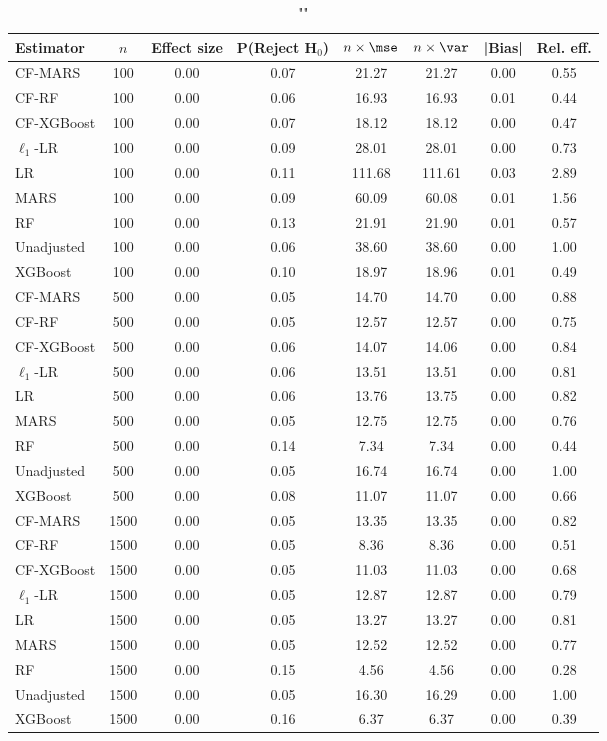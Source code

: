 \begin{table}
\centering
\caption{""}
\begin{tabular}{lccccccc}
\toprule
Estimator & $n$ & Effect size & P(Reject H$_0$) & $n\times\mse$ & $n\times \var$ & |Bias| & Rel. eff.\\ \midrule
CF-MARS & 100 & 0.00 & 0.07 &  21.27 &  21.27 & 0.00 & 0.55 \\ 
CF-RF & 100 & 0.00 & 0.06 &  16.93 &  16.93 & 0.01 & 0.44 \\ 
CF-XGBoost & 100 & 0.00 & 0.07 &  18.12 &  18.12 & 0.00 & 0.47 \\ 
$\ell_1$-LR & 100 & 0.00 & 0.09 &  28.01 &  28.01 & 0.00 & 0.73 \\ 
LR & 100 & 0.00 & 0.11 & 111.68 & 111.61 & 0.03 & 2.89 \\ 
MARS & 100 & 0.00 & 0.09 &  60.09 &  60.08 & 0.01 & 1.56 \\ 
RF & 100 & 0.00 & 0.13 &  21.91 &  21.90 & 0.01 & 0.57 \\ 
Unadjusted & 100 & 0.00 & 0.06 &  38.60 &  38.60 & 0.00 & 1.00 \\ 
XGBoost & 100 & 0.00 & 0.10 &  18.97 &  18.96 & 0.01 & 0.49 \\ \addlinespace 
CF-MARS & 500 & 0.00 & 0.05 &  14.70 &  14.70 & 0.00 & 0.88 \\ 
CF-RF & 500 & 0.00 & 0.05 &  12.57 &  12.57 & 0.00 & 0.75 \\ 
CF-XGBoost & 500 & 0.00 & 0.06 &  14.07 &  14.06 & 0.00 & 0.84 \\ 
$\ell_1$-LR & 500 & 0.00 & 0.06 &  13.51 &  13.51 & 0.00 & 0.81 \\ 
LR & 500 & 0.00 & 0.06 &  13.76 &  13.75 & 0.00 & 0.82 \\ 
MARS & 500 & 0.00 & 0.05 &  12.75 &  12.75 & 0.00 & 0.76 \\ 
RF & 500 & 0.00 & 0.14 &   7.34 &   7.34 & 0.00 & 0.44 \\ 
Unadjusted & 500 & 0.00 & 0.05 &  16.74 &  16.74 & 0.00 & 1.00 \\ 
XGBoost & 500 & 0.00 & 0.08 &  11.07 &  11.07 & 0.00 & 0.66 \\ \addlinespace 
CF-MARS & 1500 & 0.00 & 0.05 &  13.35 &  13.35 & 0.00 & 0.82 \\ 
CF-RF & 1500 & 0.00 & 0.05 &   8.36 &   8.36 & 0.00 & 0.51 \\ 
CF-XGBoost & 1500 & 0.00 & 0.05 &  11.03 &  11.03 & 0.00 & 0.68 \\ 
$\ell_1$-LR & 1500 & 0.00 & 0.05 &  12.87 &  12.87 & 0.00 & 0.79 \\ 
LR & 1500 & 0.00 & 0.05 &  13.27 &  13.27 & 0.00 & 0.81 \\ 
MARS & 1500 & 0.00 & 0.05 &  12.52 &  12.52 & 0.00 & 0.77 \\ 
RF & 1500 & 0.00 & 0.15 &   4.56 &   4.56 & 0.00 & 0.28 \\ 
Unadjusted & 1500 & 0.00 & 0.05 &  16.30 &  16.29 & 0.00 & 1.00 \\ 
XGBoost & 1500 & 0.00 & 0.16 &   6.37 &   6.37 & 0.00 & 0.39 \\
\bottomrule
\end{tabular}
\end{table}

